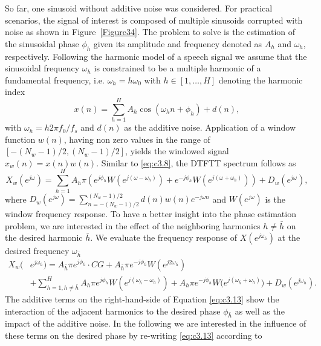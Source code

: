 So far, one sinusoid without additive noise was considered. For practical scenarios, the signal of interest is composed of multiple sinusoids corrupted with noise as shown in Figure~\ref{Figure34}. The problem to solve is the estimation of the sinusoidal phase ${\phi}_{h}$ given its amplitude and frequency denoted as $A_h$ and ${\omega}_h$, respectively. Following the harmonic model of a speech signal we assume that the sinusoidal frequency ${\omega}_h$ is constrained to be a multiple harmonic of a fundamental frequency, i.e. ${\omega}_h=h{\omega}_0$ with $h\in[1,\ldots,H]$ denoting the harmonic index
\begin{equation}\label{eq:c3.11}
	x(n)=\sum_{h=1}^H{A_h\cos({\omega}_hn+{\phi}_h)}+d(n),
\end{equation}
with $\omega_h=h2\pi f_0/f_s$ and $d(n)$ as the additive noise. Application of a window function $w(n)$, having non zero values in the range of $[-(N_w-1)/2,(N_w-1)/2]$, yields the windowed signal $x_w(n)=x(n)w(n)$. Similar to \eqref{eq:c3.8}, the \gls{DTFT}T spectrum follows as
\begin{equation}\label{eq:c3.12}
	X_w(e^{j\omega})=\sum_{h=1}^{H} A_h\pi \left( e^{j{\phi}_h}W(e^{j(\omega-{\omega}_h)}) + e^{-j{\phi}_h}W(e^{j(\omega+{\omega}_h)})\right)+D_w(e^{j\omega}),
\end{equation}
where $D_w(e^{j\omega})=\sum_{n=-(N_w-1)/2}^{(N_w-1)/2}{d(n)w(n)e^{-j{\omega}n}}$ and $W(e^{j\omega})$ is the window frequency response. To have a better insight into the phase estimation problem, we are interested in the effect of the neighboring harmonics $h\neq \bar{h}$ on the desired harmonic $\bar{h}$. We evaluate the frequency response of $X(e^{j\omega_{\bar{h}}})$ at the desired frequency ${\omega}_{\bar{h}}$
\begin{equation}\label{eq:c3.13}
	\begin{split}
		X_w(&e^{j\omega_{\bar{h}}})=A_{\bar{h}}\pi e^{j{\phi}_{\bar{h}}}\cdot CG+A_{\bar{h}}\pi e^{-j{\phi}_{\bar{h}}}W(e^{j2\omega_{\bar{h}}})\\
		&+\sum_{h=1,h\neq{\bar{h}}}^H {A_h\pi e^{j{\phi}_h}W(e^{j(\omega_{\bar{h}}-\omega_h)})+A_h\pi e^{-j{\phi}_h}W(e^{j(\omega_{\bar{h}}+\omega_h)}})+D_w(e^{j\omega_{\bar{h}}}).
	\end{split}
\end{equation}
The additive terms on the right-hand-side of Equation \eqref{eq:c3.13} show the interaction of the adjacent harmonics to the desired phase $\phi_{\bar{h}}$ as well as the impact of the additive noise. In the following we are interested in the influence of these terms on the desired phase by re-writing \eqref{eq:c3.13} according to

